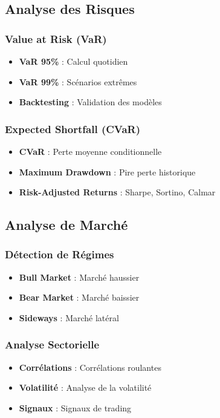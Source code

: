 \subsection{Analyse des Risques}
\subsubsection{Value at Risk (VaR)}
\begin{itemize}
    \item \textbf{VaR 95\%} : Calcul quotidien
    \item \textbf{VaR 99\%} : Scénarios extrêmes
    \item \textbf{Backtesting} : Validation des modèles
\end{itemize}

\subsubsection{Expected Shortfall (CVaR)}
\begin{itemize}
    \item \textbf{CVaR} : Perte moyenne conditionnelle
    \item \textbf{Maximum Drawdown} : Pire perte historique
    \item \textbf{Risk-Adjusted Returns} : Sharpe, Sortino, Calmar
\end{itemize}

\subsection{Analyse de Marché}
\subsubsection{Détection de Régimes}
\begin{itemize}
    \item \textbf{Bull Market} : Marché haussier
    \item \textbf{Bear Market} : Marché baissier
    \item \textbf{Sideways} : Marché latéral
\end{itemize}

\subsubsection{Analyse Sectorielle}
\begin{itemize}
    \item \textbf{Corrélations} : Corrélations roulantes
    \item \textbf{Volatilité} : Analyse de la volatilité
    \item \textbf{Signaux} : Signaux de trading
\end{itemize}
